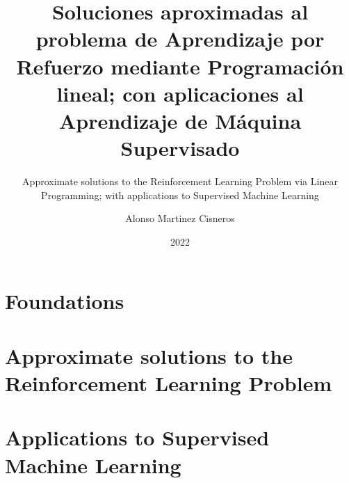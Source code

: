 \documentclass[colorful]{sty/itam-thesis}
\author{Alonso Martinez Cisneros}
\title{%
	Soluciones aproximadas al problema de Aprendizaje por Refuerzo mediante
	Programación lineal; con aplicaciones al Aprendizaje de Máquina Supervisado%
}
\subtitle{%
	Approximate solutions to the Reinforcement Learning Problem via Linear
	Programming; with applications to Supervised Machine Learning%
}
\date{2022}
\begin{document}
\pagestyle{plain}

\frontmatter
{}
\maketitle
\makefrontmatter






{
	\hypersetup{hidelinks}

	\tableofcontents
	\listofalgorithms
}

\cleardoublepage
\mainmatter

\pagestyle{plain}

% 


\part{Foundations}
\label{part:I}

	
	
	

\part{Approximate solutions to the Reinforcement Learning Problem}
\label{part:II}

	
	
	
\part{Applications to Supervised Machine Learning}
\label{part:III}

	
	
	

\appendix
{}

	
	

\nocite{*}
\printbibliography
\end{document}
